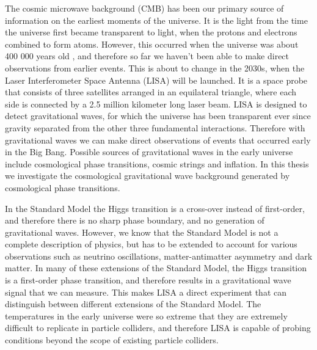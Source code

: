 \iffalse
Raise the interest of the reader!

Tip for style: discuss the same things from another point of view (in the light of the results) in the conclusion.
-> Binds the thesis together.

\begin{itemize}
    \item Background for the choice of theme
    \item A discussion of the research question or thesis statement
    \item A schematic outline of the thesis
\end{itemize}

Research question: how to simulate the gravitational spectra caused by different equations of state with PTtools?
\fi

The cosmic microwave background (CMB) has been our primary source of information on the earliest moments of the universe.
It is the light from the time the universe first became transparent to light, when the protons and electrons combined to form atoms.
However, this occurred when the universe was about 400 000 years old , and therefore so far we haven't been able to make direct observations from earlier events.
This is about to change in the 2030s, when the Laser Interferometer Space Antenna (LISA) will be launched.
It is a space probe that consists of three satellites arranged in an equilateral triangle, where each side is connected by a 2.5 million kilometer long laser beam.
LISA is designed to detect gravitational waves,
for which the universe has been transparent ever since gravity separated from the other three fundamental interactions.
Therefore with gravitational waves we can make direct observations of events that occurred early in the Big Bang.
Possible sources of gravitational waves in the early universe include cosmological phase transitions, cosmic strings and inflation.
In this thesis we investigate the cosmological gravitational wave background generated by cosmological phase transitions.

In the Standard Model the Higgs transition is a cross-over instead of first-order,
and therefore there is no sharp phase boundary, and no generation of gravitational waves.
However, we know that the Standard Model is not a complete description of physics,
but has to be extended to account for various observations such as neutrino oscillations, matter-antimatter asymmetry and dark matter.
In many of these extensions of the Standard Model, the Higgs transition is a first-order phase transition,
and therefore results in a gravitational wave signal that we can measure.
This makes LISA a direct experiment that can distinguish between different extensions of the Standard Model.
The temperatures in the early universe were so extreme that they are extremely difficult to replicate in particle colliders,
and therefore LISA is capable of probing conditions beyond the scope of existing particle colliders.

